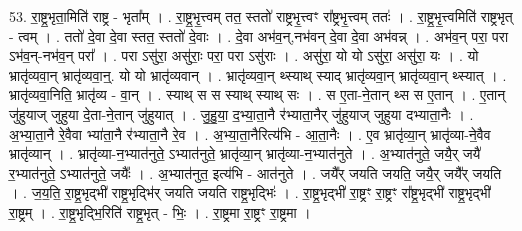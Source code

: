 \documentclass[17pt]{extarticle}
\begin{document}
53. रा॒ष्ट्र॒भृता॒मिति॑ राष्ट्र - भृता᳚म् । . रा॒ष्ट्र॒भृ॒त्त्वम् तत॒ स्ततो॑ राष्ट्रभृ॒त्त्वꣳ रा᳚ष्ट्रभृ॒त्त्वम् ततः॑ । . रा॒ष्ट्र॒भृ॒त्त्वमिति॑ राष्ट्रभृत् - त्वम् । . ततो॑ दे॒वा दे॒वा स्तत॒ स्ततो॑ दे॒वाः । . दे॒वा अभ॑व॒न्,नभ॑वन् दे॒वा दे॒वा अभ॑वन्न् । . अभ॑व॒न् परा॒ परा ऽभ॑व॒न्-नभ॑व॒न् परा᳚ । . परा ऽसु॑रा॒ असु॑राः॒ परा॒ परा ऽसु॑राः । . असु॑रा॒ यो यो ऽसु॑रा॒ असु॑रा॒ यः । . यो भ्रातृ॑व्यवा॒न् भ्रातृ॑व्यवा॒न्॒. यो यो भ्रातृ॑व्यवान् । . भ्रातृ॑व्यवा॒न् थ्स्याथ् स्याद् भ्रातृ॑व्यवा॒न् भ्रातृ॑व्यवा॒न् थ्स्यात् । . भ्रातृ॑व्यवा॒निति॒ भ्रातृ॑व्य - वा॒न् । . स्याथ् स स स्याथ् स्याथ् सः । . स ए॒ता-ने॒तान् थ्स स ए॒तान् । . ए॒तान् जु॑हुयाज् जुहुया दे॒ता-ने॒तान् जु॑हुयात् । . जु॒हु॒या॒ द॒भ्या॒ता॒नै र॑भ्याता॒नैर् जु॑हुयाज् जुहुया दभ्याता॒नैः । . अ॒भ्या॒ता॒नै रे॒वैवा भ्या॑ता॒नै र॑भ्याता॒नै रे॒व । . अ॒भ्या॒ता॒नैरित्य॑भि - आ॒ता॒नैः । . ए॒व भ्रातृ॑व्या॒न् भ्रातृ॑व्या-ने॒वैव भ्रातृ॑व्यान् । . भ्रातृ॑व्या-न॒भ्यात॑नुते॒ ऽभ्यात॑नुते॒ भ्रातृ॑व्या॒न् भ्रातृ॑व्या-न॒भ्यात॑नुते । . अ॒भ्यात॑नुते॒ जयै॒र् जयै॑ र॒भ्यात॑नुते॒ ऽभ्यात॑नुते॒ जयैः᳚ । . अ॒भ्यात॑नुत॒ इत्य॑भि - आत॑नुते । . जयै᳚र् जयति जयति॒ जयै॒र् जयै᳚र् जयति । . ज॒य॒ति॒ रा॒ष्ट्र॒भृद्भी॑ राष्ट्र॒भृद्भि॑र् जयति जयति राष्ट्र॒भृद्भिः॑ । . रा॒ष्ट्र॒भृद्भी॑ रा॒ष्ट्रꣳ रा॒ष्ट्रꣳ रा᳚ष्ट्र॒भृद्भी॑ राष्ट्र॒भृद्भी॑ रा॒ष्ट्रम् । . रा॒ष्ट्र॒भृद्भि॒रिति॑ राष्ट्र॒भृत् - भिः॒ । . रा॒ष्ट्रमा रा॒ष्ट्रꣳ रा॒ष्ट्रमा । \newline
\end{document}
